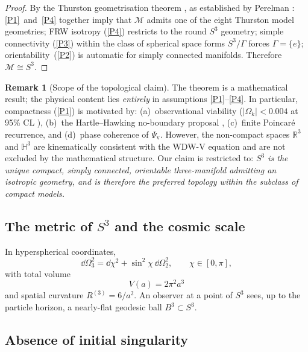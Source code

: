 \documentclass[12pt,a4paper]{article}
\theoremstyle{plain}
\theoremstyle{definition}
\newtheorem{remark}[theorem]{Remark}
\newcommand{\Psiv}{\Psi_{\mathrm{v}}}
\newcommand{\Mth}{\mathcal{M}}
\begin{document}
\begin{proof}
By the Thurston geometrisation theorem \cite{Thurston1982}, as established
by Perelman \cite{PerelmanI,PerelmanII,PerelmanIII}:
\ref{P1}~and~\ref{P4} together imply that $\Mth$ admits one of the
eight Thurston model geometries; FRW isotropy (\ref{P4}) restricts to the
round $S^3$ geometry; simple connectivity (\ref{P3}) within the class of
spherical space forms $S^3/\Gamma$ forces $\Gamma = \{e\}$;
orientability~(\ref{P2}) is automatic for simply connected manifolds.
Therefore $\Mth\cong S^3$.
\end{proof}

\begin{remark}[Scope of the topological claim]
\label{rem:scope_topology}
The theorem is a mathematical result; the physical content lies
\emph{entirely} in assumptions \ref{P1}--\ref{P4}.
In particular, compactness (\ref{P1}) is motivated by: (a)~observational
viability ($|\Omega_k| < 0.004$ at 95\% CL \cite{Planck2020}),
(b)~the Hartle--Hawking no-boundary proposal \cite{HartleHawking1983},
(c)~finite Poincar\'e recurrence, and
(d)~phase coherence of $\Psiv$.
However, the non-compact spaces $\mathbb{R}^3$ and $\mathbb{H}^3$ are
kinematically consistent with the WDW-V equation and are not excluded
by the mathematical structure.
Our claim is restricted to: \emph{$S^3$ is the unique compact, simply
connected, orientable three-manifold admitting an isotropic geometry, and
is therefore the preferred topology within the subclass of compact models.}
\end{remark}

\subsection{The metric of $S^3$ and the cosmic scale}

In hyperspherical coordinates,
\begin{equation}
  \dd\Omega_3^2 = \dd\chi^2 + \sin^2\!\chi\,\dd\Omega_2^2,
  \qquad \chi\in[0,\pi],
  \label{eq:S3metric}
\end{equation}
with total volume
\begin{equation}
  \boxed{V(a) = 2\pi^2 a^3}
  \label{eq:volume}
\end{equation}
and spatial curvature $R^{(3)} = 6/a^2$.
An observer at a point of $S^3$ sees, up to the particle horizon, a
nearly-flat geodesic ball $B^3\subset S^3$.

\subsection{Absence of initial singularity}
\end{document}
